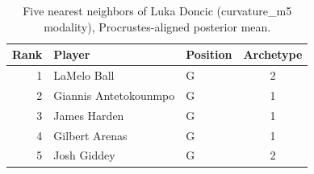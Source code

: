 \begin{table}[htbp]
  \centering\small
  \begin{tabular}{rllc}
    \toprule
    Rank & Player & Position & Archetype \\
    \midrule
    1 & LaMelo Ball & G & 2 \\
    2 & Giannis Antetokounmpo & G & 1 \\
    3 & James Harden & G & 1 \\
    4 & Gilbert Arenas & G & 1 \\
    5 & Josh Giddey & G & 2 \\
    \bottomrule
  \end{tabular}
  \caption{Five nearest neighbors of Luka Doncic (curvature_m5 modality), Procrustes-aligned posterior mean.}
  \label{tab:Luka_Doncic_neighbors_curvature_m5}
\end{table}


